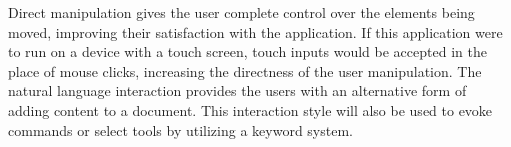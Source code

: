 \documentclass[11pt, oneside]{article}
\begin{document}
Direct manipulation gives the user complete control over the elements being moved, improving their satisfaction with the application. If this application were to run on a device with a touch screen, touch inputs would be accepted in the place of mouse clicks, increasing the directness of the user manipulation. The natural language interaction provides the users with an alternative form of adding content to a document. This interaction style will also be used to evoke commands or select tools by utilizing a keyword system. 

{}

\end{document}
